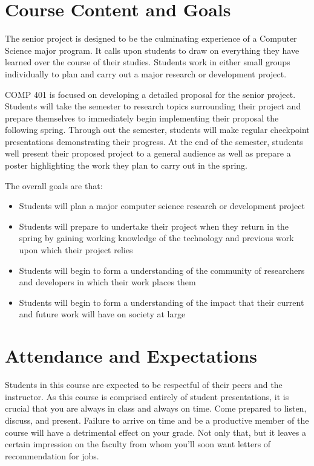 \documentclass[10pt]{article}
\begin{document}
\section{Course Content and Goals}

The senior project is designed to be the culminating experience of a Computer Science major program.  It calls upon students to draw on everything they have learned over the course of their studies. Students work in either small groups individually to plan and carry out a major research or development project.  

COMP 401 is focused on developing a detailed proposal for the senior project. Students will take the semester to research topics surrounding their project and prepare themselves to immediately begin implementing their proposal the following spring.  Through out the semester, students will make regular checkpoint presentations demonstrating their progress.  At the end of the semester, students well present their proposed project to a general audience as well as prepare a poster highlighting the work they plan to carry out in the spring. 

The overall goals are that:
\begin{itemize}
\item Students will plan a major computer science research or development project
\item Students will prepare to undertake their project when they return in the spring by gaining working knowledge of the technology and previous work upon which their project relies
\item Students will begin to form a understanding of the community of researchers and developers in which their work places them
\item Students will begin to form a understanding of the impact that their current and future work will have on society at large 
\end{itemize}

\section{Attendance and Expectations}

Students in this course are expected to be respectful of their peers and the instructor. As this course is comprised entirely of student presentations, it is crucial that you are always in class and always on time.  Come prepared to listen, discuss, and present.  Failure to arrive on time and be a productive member of the course will have a detrimental effect on your grade.  Not only that, but it leaves a certain impression on the faculty from whom you'll soon want letters of recommendation for jobs.  
\end{document}
